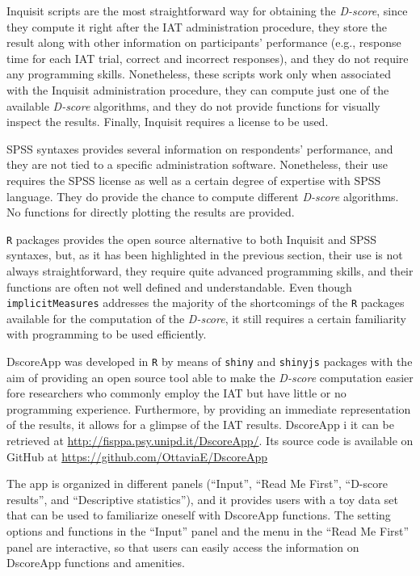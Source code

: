 \documentclass[12pt]{book}
\begin{document}
Inquisit scripts are  the most straightforward way for obtaining the \emph{D-score}, since they compute it right after the IAT administration procedure, they store the result along with other information on participants' performance (e.g., response time for each IAT trial, correct and incorrect responses), and they do not require any programming skills. Nonetheless, these scripts work only when associated with the Inquisit administration procedure, they can compute just one of the available \emph{D-score} algorithms, and they do not provide functions for visually inspect the results. Finally, Inquisit requires a license to be used. 

SPSS syntaxes provides several information on respondents' performance, and they are not tied to a specific administration software. Nonetheless, their use requires the SPSS license as well as a certain degree of expertise with SPSS language. They do provide the chance to compute different \emph{D-score} algorithms. No functions for directly plotting the results are provided.

\texttt{R} packages provides the open source alternative to both Inquisit and SPSS syntaxes, but, as it has been highlighted in the previous section, their use is not always straightforward, they require quite advanced programming skills, and their functions are often not well defined and understandable. Even though \texttt{implicitMeasures} addresses the majority of the shortcomings of the \texttt{R} packages available for the computation of the \emph{D-score}, it still requires a certain familiarity with programming to be used efficiently.

DscoreApp was developed in \texttt{R} by means of \texttt{shiny} \cite{shiny} and \texttt{shinyjs} \cite{shinyjs} packages with the aim of providing an open source tool able to make the \emph{D-score} computation easier fore researchers who commonly employ the IAT but have little or no programming experience. Furthermore, by providing an immediate representation of the results, it allows for a glimpse of the IAT results. 
DscoreApp i it can be retrieved at  \url{http://fisppa.psy.unipd.it/DscoreApp/}. Its source code is available on GitHub at \url{https://github.com/OttaviaE/DscoreApp}

The app is organized in different panels (``Input'', ``Read Me First'', ``D-score results'', and ``Descriptive statistics''), and it provides users with a toy data set that can be used to familiarize oneself with DscoreApp functions. The setting options and functions in the ``Input'' panel and the menu in the ``Read Me First'' panel are interactive, so that users can easily access the information on
DscoreApp functions and amenities.
\end{document}
